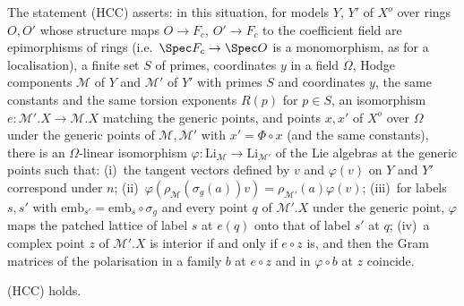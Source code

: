 \begin{definition}\label{pf:tower:def-hcc}
The statement (HCC) asserts: in this situation, for models $Y$, $Y'$ of $X^o$ over rings $O,O'$ whose structure maps
$O\to F_c$, $O'\to F_c$ to the coefficient field are epimorphisms of rings (i.e.\ $\Spec F_c\to\Spec O$ is a monomorphism, as
for a localisation), a finite set $S$ of primes, coordinates $y$ in a field $\Omega$, Hodge components $\mathcal M$ of $Y$
and $\mathcal M'$ of $Y'$ with primes $S$ and coordinates $y$, the same constants and the same torsion exponents $R(p)$ for
$p\in S$, an isomorphism $e\colon\mathcal M'.X\to\mathcal M.X$ matching the generic points, and points $x,x'$ of $X^o$ over
$\Omega$ under the generic points of $\mathcal M,\mathcal M'$ with $x'=\Phi\circ x$ (and the same constants), there is an
$\Omega$-linear isomorphism $\varphi\colon\mathrm{Li}_{\mathcal M}\to\mathrm{Li}_{\mathcal M'}$ of the Lie algebras at the
generic points such that:
(i)~the tangent vectors defined by $v$ and $\varphi(v)$ on $Y$ and $Y'$ correspond under $n$;
(ii)~$\varphi(\rho_{\mathcal M}(\sigma_g(a))v)=\rho_{\mathcal M'}(a)\varphi(v)$;
(iii)~for labels $s,s'$ with $\mathrm{emb}_{s'}=\mathrm{emb}_s\circ\sigma_g$ and every point $q$ of $\mathcal M'.X$ under the
generic point, $\varphi$ maps the patched lattice of label $s$ at $e(q)$ onto that of label $s'$ at $q$;
(iv)~a complex point $z$ of $\mathcal M'.X$ is interior if and only if $e\circ z$ is, and then the Gram matrices of the
polarisation in a family $b$ at $e\circ z$ and in $\varphi\circ b$ at $z$ coincide.
\end{definition}

\begin{proposition}\label{pf:tower:hcc}
\textup{(HCC)} holds.
\end{proposition}

